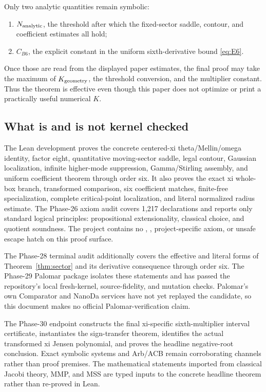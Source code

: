 Only two analytic quantities remain symbolic:
\begin{enumerate}
\item $N_{\rm analytic}$, the threshold after which the fixed-sector saddle,
contour, and coefficient estimates all hold;
\item $C_{B6}$, the explicit constant in the uniform sixth-derivative bound
\eqref{eq:E6}.
\end{enumerate}
Once those are read from the displayed paper estimates, the final proof may
take the maximum of $K_{\rm geometry}$, the threshold conversion, and the
multiplier constant.  Thus the theorem is effective even though this paper
does not optimize or print a practically useful numerical $K$.

\subsection{What is and is not kernel checked}

The Lean development proves the concrete centered-xi theta/Mellin/omega
identity, factor eight, quantitative moving-sector saddle, legal contour,
Gaussian localization, infinite higher-mode suppression, Gamma/Stirling
assembly, and uniform coefficient theorem through order six.  It also proves
the exact xi whole-box branch, transformed comparison, six coefficient
matches, finite-free specialization, complete critical-point localization,
and literal normalized radius estimate.  The Phase-26 axiom audit covers
1,217 declarations and reports only standard logical principles:
propositional extensionality, classical choice, and quotient soundness.  The
project contains no , , project-specific axiom, or
unsafe escape hatch on this proof surface.

The Phase-28 terminal audit additionally covers the effective and literal
forms of Theorem~\ref{thm:sector} and its derivative consequence through
order six.  The Phase-29 Palomar package isolates these statements and has
passed the repository's local fresh-kernel, source-fidelity, and mutation
checks.  Palomar's own Comparator and NanoDa services have not yet replayed
the candidate, so this document makes no official Palomar-verification
claim.

The Phase-30 endpoint constructs the final xi-specific sixth-multiplier
interval certificate, instantiates the sign-transfer theorem, identifies the
actual transformed xi Jensen polynomial, and proves the headline
negative-root conclusion.  Exact symbolic systems and Arb/ACB remain
corroborating channels rather than proof premises.  The mathematical
statements imported from classical Jacobi theory, MMP, and MSS are typed
inputs to the concrete headline theorem rather than re-proved in Lean.

